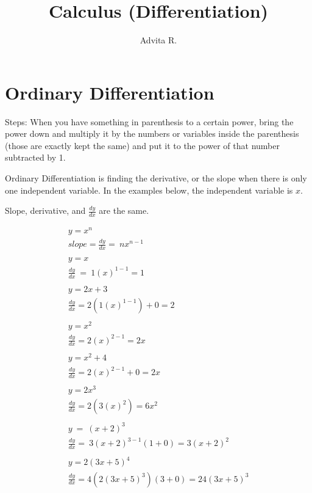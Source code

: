 \documentclass{article}
\title{Calculus (Differentiation)}
\author{Advita R.}
\begin{document}
\maketitle
\section{Ordinary Differentiation}
Steps:
When you have something in parenthesis to a certain power, bring the power down and multiply it by the numbers or variables inside the parenthesis (those are exactly kept the same) and put it to the power of that number subtracted by 1.


Ordinary Differentiation is finding the derivative, or the slope when there is only one independent variable. In the examples below, the independent variable is $x$.

Slope, derivative, and $\displaystyle \frac{dy}{dx}$ are the same.

\begin{equation}
\begin{array}{l}
y=x^{n}\\
slope=\frac{dy}{dx} =\ nx^{n-1}\\
\\
y=x\\
\frac{dy}{dx} \ =\ 1( x)^{1-1} =1\\
\\
y=2x+3\\
\frac{dy}{dx} =2\left( 1( x)^{1-1}\right) +0=2\\
\\
y=x^{2}\\
\frac{dy}{dx} =2( x)^{2-1} =2x\\
\\
y=x^{2} +4\\
\frac{dy}{dx} =2( x)^{2-1} +0=2x\\
\\
y=2x^{3}\\
\frac{dy}{dx} =2\left( 3( x)^{2}\right) =6x^{2}\\
\\
y\ =\ ( x+2)^{3}\\
\frac{dy}{dx} =\ 3( x+2)^{3-1}( 1+0) =3( x+2)^{2}\\
\\
y=2( 3x+5)^{4}\\
\frac{dy}{dx} =4\left( 2( 3x+5)^{3}\right)( 3+0) =24( 3x+5)^{3}
\end{array}
\end{equation} \\\\\\\\\\\\\\\\\\\\\\\\\\
\end{document}
